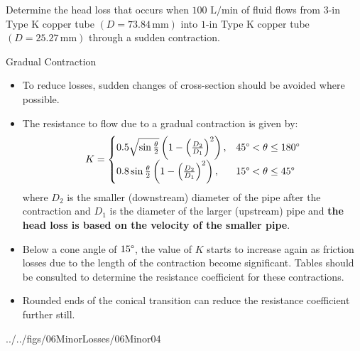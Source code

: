 \documentclass[9pt,xcolor={svgnames, x11names},professionalfonts, mathserif]{beamer}
\begin{document}

\begin{frame}
 \centering
 \begin{myexam}[width=0.7\textwidth]{}{}
  \raggedright
  Determine the head loss that occurs when $100\text{ L/min}$ of fluid flows from $3\text{-in}$ Type K copper tube $(D=73.84\,\text{mm})$ into
  $1\text{-in}$ Type K copper tube $(D=25.27\,\text{mm})$ through a sudden contraction.
 \end{myexam}

\end{frame}


\begin{frame}{Gradual Contraction}

 \begin{itemize}

  \item To reduce losses, sudden changes of cross-section should be avoided where possible.
  \item The resistance to flow due to a gradual contraction is given by:
        \begin{equation*}
         K=
         \begin{cases}
          0.5\sqrt{\sin\frac{\theta}{2}}\left(1-\left(\frac{D_2}{D_1}\right)^2\right), & 45\degree < \theta \le 180\degree
          \\
          0.8\sin\frac{\theta}{2}\left(1-\left(\frac{D_2}{D_1}\right)^2\right),        & 15\degree < \theta \le 45\degree
         \end{cases}
        \end{equation*}
        where $D_2$ is the smaller (downstream) diameter of the pipe after the contraction and $D_1$ is the diameter of the
        larger (upstream) pipe and \textbf{the head loss is based on the velocity of the smaller pipe}.
  \item Below a cone angle of $15\degree$, the value of $K$ starts to increase again as friction losses due to the
        length of the contraction become significant.	Tables should be consulted to determine the resistance coefficient for
        these contractions.
  \item Rounded ends of the conical transition can reduce the resistance coefficient further still.

 \end{itemize}
 \par\vspace{-0.5cm}
 \begin{cfig}[0.25]{../../figs/06MinorLosses/06Minor04}\end{cfig}

\end{frame}
\end{document}
